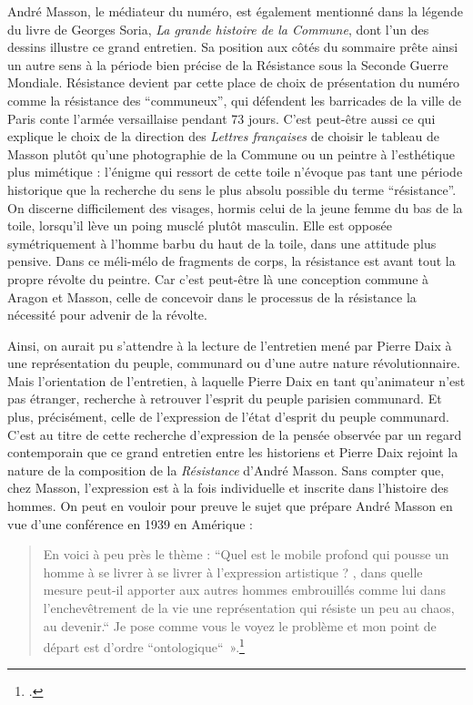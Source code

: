 André Masson, le médiateur du numéro, est également mentionné dans la légende du livre de Georges Soria, \emph{La grande histoire de la Commune}, dont l’un des dessins illustre ce grand entretien. Sa position aux côtés du sommaire prête ainsi un autre sens à la période bien précise de la Résistance sous la Seconde Guerre Mondiale. Résistance devient par cette place de choix de présentation du numéro comme la résistance des \enquote{communeux}, qui défendent les barricades de la ville de Paris conte l’armée versaillaise pendant 73 jours. C’est peut-être aussi ce qui explique le choix de la direction des \emph{Lettres françaises} de choisir le tableau de Masson plutôt qu’une photographie de la Commune ou un peintre à l’esthétique plus mimétique : l’énigme qui ressort de cette toile n’évoque pas tant une période historique que la recherche du sens le plus absolu possible du terme \enquote{résistance}. On discerne difficilement des visages, hormis celui de la jeune femme du bas de la toile, lorsqu'il lève un poing musclé plutôt masculin. Elle est opposée symétriquement à l’homme barbu du haut de la toile, dans une attitude plus pensive. Dans ce méli-mélo de fragments de corps, la résistance est avant tout la propre révolte du peintre. Car c’est peut-être là une conception commune à Aragon et Masson, celle de concevoir dans le processus de la résistance la nécessité pour advenir de la révolte.

	 Ainsi, on aurait pu s’attendre à la lecture de l’entretien mené par Pierre Daix à une représentation du peuple, communard ou d’une autre nature révolutionnaire. Mais l’orientation de l’entretien, à laquelle Pierre Daix en tant qu’animateur n’est pas étranger, recherche à retrouver l’esprit du peuple parisien communard. Et plus, précisément, celle de l'expression de l’état d’esprit du peuple communard. C’est au titre de cette recherche d’expression de la pensée observée par un regard contemporain que ce grand entretien entre les historiens et Pierre Daix rejoint la nature de la composition de la \emph{Résistance} d’André Masson. Sans compter que, chez Masson, l’expression est à la fois individuelle et inscrite dans l’histoire des hommes. On peut en vouloir pour preuve le sujet que prépare André Masson en vue d’une conférence en 1939 en Amérique :
\begin{quote}
En voici  à peu près le thème : “Quel est le mobile profond qui pousse un homme à se livrer à se livrer  à l’expression artistique ? , dans quelle mesure peut-il apporter aux autres hommes embrouillés comme lui dans l’enchevêtrement de la vie une représentation qui résiste un peu au chaos, au devenir.“ Je pose comme vous le voyez le problème et mon point de départ est d’ordre “ontologique“ ».\footcite[p259]{rebelle} \end{quote}
 
